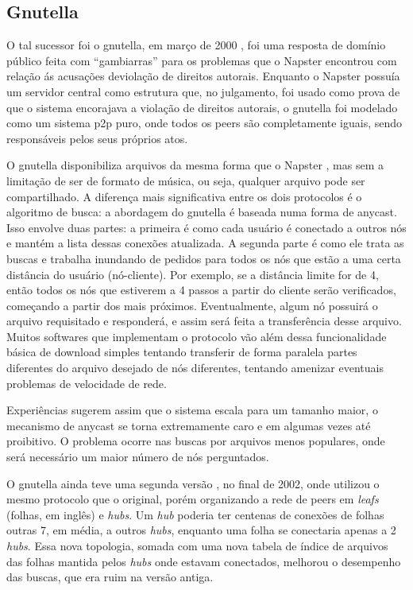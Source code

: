 \subsection{Gnutella}

O tal sucessor foi o \gls{gnutella}, em março de 2000 \cite{wiki:gnutella}, foi uma
resposta de domínio público feita com ``gambiarras'' para os problemas que o Napster
encontrou com relação ás acusações deviolação de direitos autorais. Enquanto o Napster
possuía um servidor central como estrutura que, no julgamento, foi usado como prova de
que o sistema encorajava a violação de direitos autorais, o \gls*{gnutella} foi modelado
como um sistema \gls*{p2p} puro, onde todos os \glspl*{peer} são completamente iguais,
sendo responsáveis pelos seus próprios atos.

O \gls*{gnutella} disponibiliza arquivos da mesma forma que o Napster
\cite{book:birman}, mas sem a limitação de ser de formato de música, ou seja, qualquer
arquivo pode ser compartilhado. A diferença mais significativa entre os dois protocolos
é o algoritmo de busca: a abordagem do \gls*{gnutella} é baseada numa forma de
\gls{anycast}. Isso envolve duas partes: a primeira é como cada usuário é conectado a
outros nós e mantém a lista dessas conexões atualizada. A segunda parte é como ele
trata as buscas e trabalha inundando de pedidos para todos os nós que estão a uma certa
distância do usuário (nó-cliente). Por exemplo, se a distância limite for de 4, então
todos os nós que estiverem a 4 passos a partir do cliente serão verificados, começando
a partir dos mais próximos. Eventualmente, algum nó possuirá o arquivo requisitado e
responderá, e assim será feita a transferência desse arquivo. Muitos softwares que
implementam o protocolo vão além dessa funcionalidade básica de download simples
tentando transferir de forma paralela partes diferentes do arquivo desejado de nós
diferentes, tentando amenizar eventuais problemas de velocidade de rede.

Experiências sugerem assim que o sistema escala para um tamanho maior, o mecanismo de
\gls*{anycast} se torna extremamente caro e em algumas vezes até proibitivo. O problema
ocorre nas buscas por arquivos menos populares, onde será necessário um maior número de
nós perguntados.

O \gls*{gnutella} ainda teve uma segunda versão \cite{wiki:gnutella2}, no final de 2002,
onde utilizou o mesmo protocolo que o original, porém organizando a rede de
\glspl*{peer} em \emph{leafs} (folhas, em inglês) e \emph{hubs}. Um \emph{hub} poderia
ter centenas de conexões de folhas outras 7, em média, a outros \emph{hubs}, enquanto
uma folha se conectaria apenas a 2 \emph{hubs}. Essa nova topologia, somada com uma
nova tabela de índice de arquivos das folhas mantida pelos \emph{hubs} onde estavam
conectados, melhorou o desempenho das buscas, que era ruim na versão antiga.

